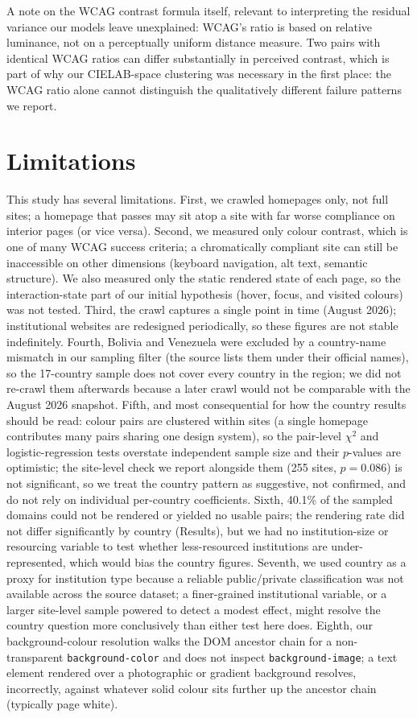 \documentclass[10pt]{article}
\begin{document}
A note on the WCAG contrast formula itself, relevant to interpreting the residual variance our models leave unexplained: WCAG's ratio is based on relative luminance, not on a perceptually uniform distance measure. Two pairs with identical WCAG ratios can differ substantially in perceived contrast, which is part of why our CIELAB-space clustering was necessary in the first place: the WCAG ratio alone cannot distinguish the qualitatively different failure patterns we report.

\section{Limitations}

This study has several limitations. First, we crawled homepages only, not full sites; a homepage that passes may sit atop a site with far worse compliance on interior pages (or vice versa). Second, we measured only colour contrast, which is one of many WCAG success criteria; a chromatically compliant site can still be inaccessible on other dimensions (keyboard navigation, alt text, semantic structure). We also measured only the static rendered state of each page, so the interaction-state part of our initial hypothesis (hover, focus, and visited colours) was not tested. Third, the crawl captures a single point in time (August 2026); institutional websites are redesigned periodically, so these figures are not stable indefinitely. Fourth, Bolivia and Venezuela were excluded by a country-name mismatch in our sampling filter (the source lists them under their official names), so the 17-country sample does not cover every country in the region; we did not re-crawl them afterwards because a later crawl would not be comparable with the August 2026 snapshot. Fifth, and most consequential for how the country results should be read: colour pairs are clustered within sites (a single homepage contributes many pairs sharing one design system), so the pair-level $\chi^2$ and logistic-regression tests overstate independent sample size and their $p$-values are optimistic; the site-level check we report alongside them (255 sites, $p=0.086$) is not significant, so we treat the country pattern as suggestive, not confirmed, and do not rely on individual per-country coefficients. Sixth, 40.1\% of the sampled domains could not be rendered or yielded no usable pairs; the rendering rate did not differ significantly by country (Results), but we had no institution-size or resourcing variable to test whether less-resourced institutions are under-represented, which would bias the country figures. Seventh, we used country as a proxy for institution type because a reliable public/private classification was not available across the source dataset; a finer-grained institutional variable, or a larger site-level sample powered to detect a modest effect, might resolve the country question more conclusively than either test here does. Eighth, our background-colour resolution walks the DOM ancestor chain for a non-transparent \texttt{background-color} and does not inspect \texttt{background-image}; a text element rendered over a photographic or gradient background resolves, incorrectly, against whatever solid colour sits further up the ancestor chain (typically page white). 
\end{document}
